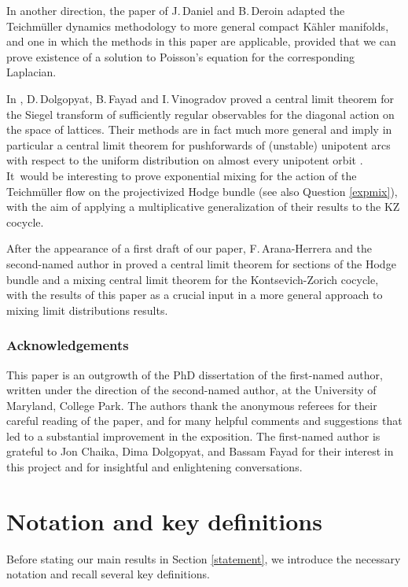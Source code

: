 \documentclass[JEP,XML,SOM,Unicode,published]{cedram}
\theoremstyle{plain}
\theoremstyle{definition}
\numberwithin{equation}{subsection}
\newcommand{\Tm}{Teichmüller\xspace}
\begin{document}
In another direction, the paper of J.\,Daniel and B.\,Deroin \cite{DD19} adapted the \Tm dynamics methodology to more general compact Kähler manifolds, and one in which the methods in this paper are applicable, provided that we can prove existence of a solution to Poisson's equation for the corresponding Laplacian.

In \cite{DFV17}, D.\,Dolgopyat, B.\,Fayad and I.\,Vinogradov proved a central limit theorem for the Siegel transform of sufficiently regular observables for the diagonal action on the space of
lattices. Their methods are in fact much more general and imply in particular a central limit theorem for pushforwards of (unstable) unipotent arcs with respect to the uniform distribution on almost every unipotent orbit \cite[Th.\,7.1, Cor.\,7.2]{DFV17}. It~would be interesting to prove exponential mixing for the action of the Teichmüller flow on the projectivized Hodge bundle (see also Question \ref{expmix}), with the aim of applying a multiplicative generalization of their results to the KZ cocycle.

After the appearance of a first
draft of our paper, F.\,Arana-Herrera and the second-named author in \cite{AF24} proved a central limit theorem for sections of the Hodge bundle and a mixing central limit theorem for the Kontsevich-Zorich cocycle, with the results of this paper as a crucial input in a more general approach to
mixing limit distributions results.

\subsubsection*{Acknowledgements} This paper is an outgrowth of the PhD dissertation of the first-named author, written under the direction of the second-named author, at the University of Maryland, College Park. The authors thank the anonymous referees for their careful reading of the paper, and for many helpful comments and suggestions that led to a substantial improvement in the exposition. The first-named author is grateful to Jon Chaika, Dima Dolgopyat, and Bassam Fayad for their interest in this project and for insightful and enlightening conversations.\enlargethispage{.7\baselineskip}

\section{Notation and key definitions}

Before stating our main results in Section \ref{statement}, we introduce the necessary notation and recall several key definitions.
\end{document}
